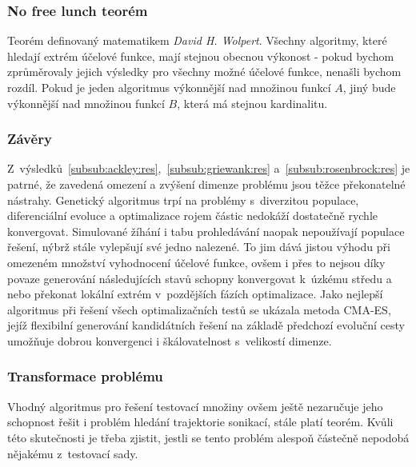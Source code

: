 \subsubsection{No free lunch teorém}
Teorém definovaný matematikem \textit{David H. Wolpert}. Všechny algoritmy, které hledají extrém účelové funkce, mají stejnou obecnou výkonost - pokud bychom zprůměrovaly jejich výsledky pro všechny možné účelové funkce, nenašli bychom rozdíl. Pokud je jeden algoritmus výkonnější nad množinou funkcí $A$, jiný bude výkonnější nad množinou funkcí $B$, která má stejnou kardinalitu.

\subsubsection{Závěry}
Z~výsledků~\ref{subsub:ackley:res},~\ref{subsub:griewank:res} a~\ref{subsub:rosenbrock:res} je patrné, že zavedená omezení a zvýšení dimenze problému jsou těžce překonatelné nástrahy. Genetický algoritmus trpí na problémy s~diverzitou populace, diferenciální evoluce a optimalizace rojem částic nedokáží dostatečně rychle konvergovat. Simulované žíhání i tabu prohledávání naopak nepoužívají populace řešení, nýbrž stále vylepšují své jedno nalezené. To jim dává jistou výhodu při omezeném množství vyhodnocení účelové funkce, ovšem i přes to nejsou díky povaze generování následujících stavů schopny konvergovat k~úzkému středu a nebo překonat lokální extrém v~pozdějších fázích optimalizace. Jako nejlepší algoritmus při řešení všech optimalizačních testů se ukázala metoda CMA-ES, jejíž flexibilní generování kandidátních řešení na základě předchozí evoluční cesty umožňuje dobrou konvergenci i škálovatelnost s~velikostí dimenze.



\subsubsection{Transformace problému}
Vhodný algoritmus pro řešení testovací množiny ovšem ještě nezaručuje jeho schopnost řešit i problém hledání trajektorie sonikací, stále platí  teorém. Kvůli této skutečnosti je třeba zjistit, jestli se tento problém alespoň částečně nepodobá nějakému z~testovací sady.

